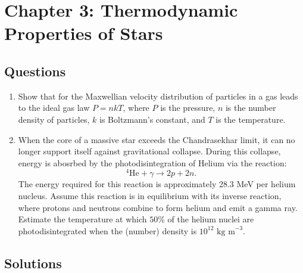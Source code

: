 \section{Chapter 3: Thermodynamic Properties of Stars}
\subsection{Questions}
\begin{enumerate}
\item Show that for the Maxwellian velocity distribution of particles in a gas leads to the ideal gas law $P = nkT$, where $P$ is the pressure, $n$ is the number density of particles, $k$ is Boltzmann's constant, and $T$ is the temperature.

\item When the core of a massive star exceeds the Chandrasekhar limit, it can no longer support itself against gravitational collapse.
During this collapse, energy is abosrbed by the photodisintegration of Helium via the reaction:
\begin{equation}
^4\text{He} + \gamma \rightarrow 2p + 2n.
\end{equation}
The energy required for this reaction is approximately 28.3 MeV per helium nucleus. Assume this reaction is in equilibrium with its inverse reaction, where protons and neutrons combine to form helium and emit a gamma ray. 
Estimate the temperature at which $50\%$ of the helium nuclei are photodisintegrated when the (number) density is $10^{12} \text{ kg m}^{-3}$.
\end{enumerate}


\subsection{Solutions}
